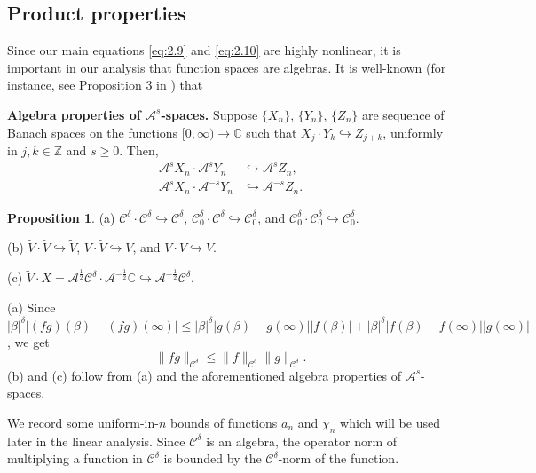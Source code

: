 \documentclass[11pt]{article}
\makeatletter
\renewenvironment{proof}[1][\proofname]{\par
  \vspace{-.7\topsep}%
  \pushQED{\qed}%
  \normalfont
  \topsep0pt \partopsep0pt %
  \trivlist
  \item[\hskip\labelsep
        \itshape
    #1\@addpunct{.}]\ignorespaces
}{%
  \popQED\endtrivlist\@endpefalse
  \addvspace{6pt plus 6pt} %
}
\theoremstyle{definition}
\newtheorem{prop}[theorem]{Proposition}
\theoremstyle{remark}
\numberwithin{equation}{section}
\newcommand{\tbf}{\textbf}
\newcommand{\mbb}{\mathbb}
\newcommand{\mcal}{\mathcal}
\renewcommand{\tilde}{\widetilde}
\newcommand{\Z}{\mbb{Z}}
\newcommand{\C}{\mbb{C}}
\newcommand{\norm}[1]{\lVert #1 \rVert}
\makeatother
\begin{document}
\subsection{Product properties} \label{subsec:3.1}
Since our main equations \eqref{eq:2.9} and \eqref{eq:2.10} are highly nonlinear, it is important in our analysis that function spaces are algebras. It is well-known (for instance, see Proposition 3 in \cite{Ell16}) that

\noindent\tbf{Algebra properties of $\mcal{A}^s$-spaces.} Suppose $\{X_n\}$, $\{Y_n\}$, $\{Z_n\}$ are sequence of Banach spaces on the functions $[0,\infty) \to \C$ such that $X_j \cdot Y_k \hookrightarrow Z_{j+k}$, uniformly in $j,k\in \Z$ and $s\geq 0$. Then,
\begin{align*}
	\mcal{A}^s X_n \cdot \mcal{A}^s Y_n &\hookrightarrow \mcal{A}^s Z_n, \\
	\mcal{A}^s X_n \cdot \mcal{A}^{-s} Y_n &\hookrightarrow \mcal{A}^{-s} Z_n.
\end{align*}
\begin{prop} \label{prop:3.3}
(a) $\mcal{C}^\delta \cdot \mcal{C}^\delta \hookrightarrow \mcal{C}^\delta$, $\mcal{C}^\delta_0 \cdot \mcal{C}^\delta \hookrightarrow \mcal{C}^\delta_0$, and $\mcal{C}^\delta_0 \cdot \mcal{C}^\delta_0 \hookrightarrow \mcal{C}^\delta_0$.

\noindent (b) $\tilde{V} \cdot \tilde{V} \hookrightarrow \tilde{V}$, $V \cdot \tilde{V} \hookrightarrow V$, and $V \cdot V \hookrightarrow V$.

\noindent (c) $\tilde{V} \cdot X = \mcal{A}^{\frac{1}{2}} \mcal{C}^\delta \cdot \mcal{A}^{-\frac{1}{2}} \C \hookrightarrow \mcal{A}^{-\frac{1}{2}} \mcal{C}^\delta$.
\end{prop}
\begin{proof}
(a) Since $|\beta|^\delta |(fg)(\beta) - (fg)(\infty)| \leq |\beta|^\delta |g(\beta) - g(\infty)| |f(\beta)| + |\beta|^\delta |f(\beta) - f(\infty)| |g(\infty)|$, we get
\[\norm{fg}_{\mcal{C}^\delta} \leq \norm{f}_{\mcal{C}^\delta} \norm{g}_{\mcal{C}^\delta}.\]
(b) and (c) follow from (a) and the aforementioned algebra properties of $\mcal{A}^s$-spaces.
\end{proof}

We record some uniform-in-$n$ bounds of functions $a_n$ and $\chi_n$ which will be used later in the linear analysis. Since $\mcal{C}^\delta$ is an algebra, the operator norm of multiplying a function in $\mcal{C}^\delta$ is bounded by the $\mcal{C}^\delta$-norm of the function.
\end{document}
